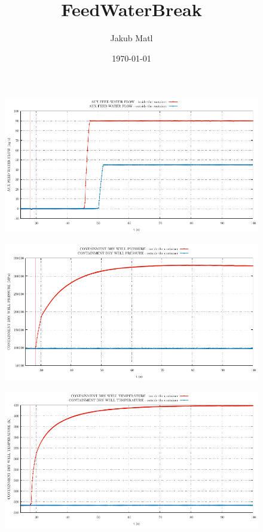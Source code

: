 \documentclass{article}
\title{FeedWaterBreak}
\author{Jakub Matl}
\date{\today}
\begin{document}
\maketitle
\begin{multicols}{2}
\begin{figure}[H]
\centering
\includegraphics[width=\linewidth]{./graphs/AUX FEED WATER FLOW_comp.pdf}
\end{figure}
\begin{figure}[H]
\centering
\includegraphics[width=\linewidth]{./graphs/CONTAINMENT DRY WELL PRESSURE_comp.pdf}
\end{figure}
\begin{figure}[H]
\centering
\includegraphics[width=\linewidth]{./graphs/CONTAINMENT DRY WELL TEMPERATURE_comp.pdf}

\end{figure}
\end{multicols}
\end{document}

